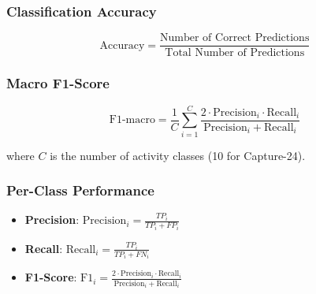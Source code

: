 \subsubsection{Classification Accuracy}
\[\text{Accuracy} = \frac{\text{Number of Correct Predictions}}{\text{Total Number of Predictions}}\]

\subsubsection{Macro F1-Score}
\[\text{F1-macro} = \frac{1}{C} \sum_{i=1}^{C} \frac{2 \cdot \text{Precision}_i \cdot \text{Recall}_i}{\text{Precision}_i + \text{Recall}_i}\]

where $C$ is the number of activity classes (10 for Capture-24).

\subsubsection{Per-Class Performance}
\begin{itemize}
    \item \textbf{Precision}: $\text{Precision}_i = \frac{TP_i}{TP_i + FP_i}$
    \item \textbf{Recall}: $\text{Recall}_i = \frac{TP_i}{TP_i + FN_i}$
    \item \textbf{F1-Score}: $\text{F1}_i = \frac{2 \cdot \text{Precision}_i \cdot \text{Recall}_i}{\text{Precision}_i + \text{Recall}_i}$
\end{itemize}

%
%

